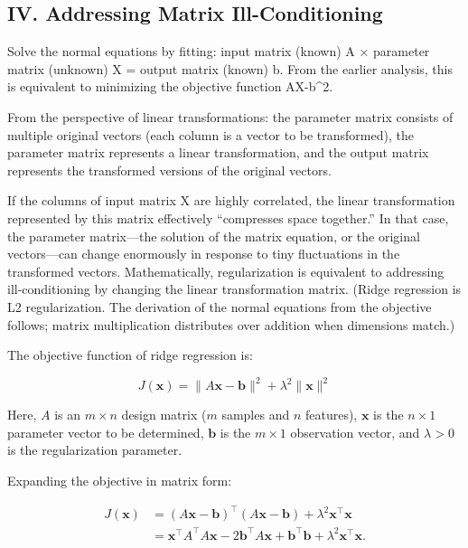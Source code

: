 \hypertarget{iv.-addressing-matrix-ill-conditioning}{%
\subsection{IV. Addressing Matrix Ill-Conditioning}\label{iv.-addressing-matrix-ill-conditioning}}

Solve the normal equations by fitting: input matrix (known) A × parameter matrix (unknown) X = output matrix (known) b. From the earlier analysis, this is equivalent to minimizing the objective function \textbar\textbar AX-b\textbar\textbar\^{}2.

From the perspective of linear transformations: the parameter matrix consists of multiple original vectors (each column is a vector to be transformed), the parameter matrix represents a linear transformation, and the output matrix represents the transformed versions of the original vectors.

If the columns of input matrix X are highly correlated, the linear transformation represented by this matrix effectively ``compresses space together.'' In that case, the parameter matrix---the solution of the matrix equation, or the original vectors---can change enormously in response to tiny fluctuations in the transformed vectors. Mathematically, regularization is equivalent to addressing ill-conditioning by changing the linear transformation matrix. (Ridge regression is L2 regularization. The derivation of the normal equations from the objective follows; matrix multiplication distributes over addition when dimensions match.)

The objective function of ridge regression is:

\[
J(\mathbf{x})=\lVert A\mathbf{x}-\mathbf{b}\rVert^2+\lambda^2\lVert\mathbf{x}\rVert^2
\]

Here, \(A\) is an \(m\times n\) design matrix (\(m\) samples and \(n\) features), \(\mathbf{x}\) is the \(n\times 1\) parameter vector to be determined, \(\mathbf{b}\) is the \(m\times 1\) observation vector, and \(\lambda>0\) is the regularization parameter.

Expanding the objective in matrix form:

\[
\begin{aligned}
J(\mathbf{x})
&=(A\mathbf{x}-\mathbf{b})^\top(A\mathbf{x}-\mathbf{b})
+\lambda^2\mathbf{x}^\top\mathbf{x}\\
&=\mathbf{x}^\top A^\top A\mathbf{x}
-2\mathbf{b}^\top A\mathbf{x}
+\mathbf{b}^\top\mathbf{b}
+\lambda^2\mathbf{x}^\top\mathbf{x}.
\end{aligned}
\]

